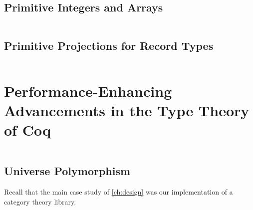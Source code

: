 $\left.\right.$
\subsection{Primitive Integers and Arrays}\label{sec:prim-ints-arrays}
$\left.\right.$
\subsection{Primitive Projections for Record Types}\label{sec:fixes:theory:primitive-projections}\label{sec:primitive-projections}
$\left.\right.$



\section{Performance-Enhancing Advancements in the Type Theory of Coq}\label{sec:fixes:coq-theory}
$\left.\right.$
\subsection{Universe Polymorphism}\label{sec:fixes:theory:univ-poly}\label{sec:univ-poly}

Recall that the main case study of \autoref{ch:design} was our implementation of a category theory library.

